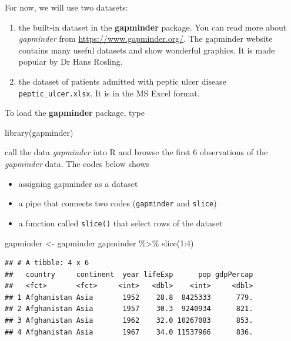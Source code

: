 \documentclass[
  10pt,
]{krantz}
\newenvironment{Shaded}{\begin{snugshade}}{\end{snugshade}}
\newcommand{\DecValTok}[1]{\textcolor[rgb]{0.00,0.00,0.81}{#1}}
\newcommand{\FunctionTok}[1]{\textcolor[rgb]{0.00,0.00,0.00}{#1}}
\newcommand{\NormalTok}[1]{#1}
\newcommand{\OtherTok}[1]{\textcolor[rgb]{0.56,0.35,0.01}{#1}}
\newcommand{\SpecialCharTok}[1]{\textcolor[rgb]{0.00,0.00,0.00}{#1}}
\providecommand{\tightlist}{%
  \setlength{\itemsep}{0pt}\setlength{\parskip}{0pt}}
\begin{document}
For now, we will use two datasets:

\begin{enumerate}
\def\labelenumi{\alph{enumi}.}
\tightlist
\item
  the built-in dataset in the \textbf{gapminder} package. You can read more about \emph{gapminder} from \url{https://www.gapminder.org/}. The gapminder website contains many useful datasets and show wonderful graphics. It is made popular by Dr Hans Rosling.
\item
  the dataset of patients admitted with peptic ulcer disease \texttt{peptic\_ulcer.xlsx}. It is in the MS Excel format.
\end{enumerate}

To load the \textbf{gapminder} package, type

\begin{Shaded}
\begin{Highlighting}[]
\FunctionTok{library}\NormalTok{(gapminder)}
\end{Highlighting}
\end{Shaded}

call the data \emph{gapminder} into R and browse the first 6 observations of the \emph{gapminder} data. The codes below shows

\begin{itemize}
\tightlist
\item
  assigning gapminder as a dataset
\item
  a pipe that connects two codes (\texttt{gapminder} and \texttt{slice})
\item
  a function called \texttt{slice()} that select rows of the dataset
\end{itemize}

\begin{Shaded}
\begin{Highlighting}[]
\NormalTok{gapminder }\OtherTok{\textless{}{-}}\NormalTok{ gapminder}
\NormalTok{gapminder }\SpecialCharTok{\%\textgreater{}\%} 
  \FunctionTok{slice}\NormalTok{(}\DecValTok{1}\SpecialCharTok{:}\DecValTok{4}\NormalTok{)}
\end{Highlighting}
\end{Shaded}

\begin{verbatim}
## # A tibble: 4 x 6
##   country     continent  year lifeExp      pop gdpPercap
##   <fct>       <fct>     <int>   <dbl>    <int>     <dbl>
## 1 Afghanistan Asia       1952    28.8  8425333      779.
## 2 Afghanistan Asia       1957    30.3  9240934      821.
## 3 Afghanistan Asia       1962    32.0 10267083      853.
## 4 Afghanistan Asia       1967    34.0 11537966      836.
\end{verbatim}
\end{document}
